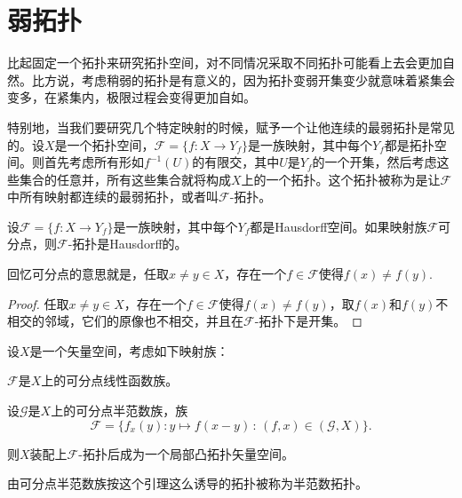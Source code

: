 \section{弱拓扑}

比起固定一个拓扑来研究拓扑空间，对不同情况采取不同拓扑可能看上去会更加自然。比方说，考虑稍弱的拓扑是有意义的，因为拓扑变弱开集变少就意味着紧集会变多，在紧集内，极限过程会变得更加自如。

特别地，当我们要研究几个特定映射的时候，赋予一个让他连续的最弱拓扑是常见的。设$X$是一个拓扑空间，$\mathscr{F}=\{f:X\to Y_f\}$是一族映射，其中每个$Y_f$都是拓扑空间。则首先考虑所有形如$f^{-1}(U)$的有限交，其中$U$是$Y_f$的一个开集，然后考虑这些集合的任意并，所有这些集合就将构成$X$上的一个拓扑。这个拓扑被称为是让$\mathscr{F}$中所有映射都连续的最弱拓扑，或者叫$\mathscr{F}$-拓扑。

\begin{pro}
设$\mathscr{F}=\{f:X\to Y_f\}$是一族映射，其中每个$Y_f$都是Hausdorff空间。如果映射族$\mathscr{F}$可分点，则$\mathscr{F}$-拓扑是Hausdorff的。
\end{pro}

回忆可分点的意思就是，任取$x\neq y\in X$，存在一个$f\in \mathscr{F}$使得$f(x)\neq f(y)$.

\begin{proof}
任取$x\neq y\in X$，存在一个$f\in \mathscr{F}$使得$f(x)\neq f(y)$，取$f(x)$和$f(y)$不相交的邻域，它们的原像也不相交，并且在$\mathscr{F}$-拓扑下是开集。
\end{proof}

\begin{lem}\label{lem:1.45}设$X$是一个矢量空间，考虑如下映射族：
\begin{compactenum}[~~~(1)]
\item $\mathscr{F}$是$X$上的可分点线性函数族。
\item 设$\mathscr{G}$是$X$上的可分点半范数族，族
\[
	\mathscr{F}=\{f_x(y):y\mapsto f(x-y)\,:\,(f,x)\in (\mathscr{G},X)\}.
\]
\end{compactenum}
则$X$装配上$\mathscr{F}$-拓扑后成为一个局部凸拓扑矢量空间。
\end{lem}

由可分点半范数族按这个引理这么诱导的拓扑被称为半范数拓扑。

